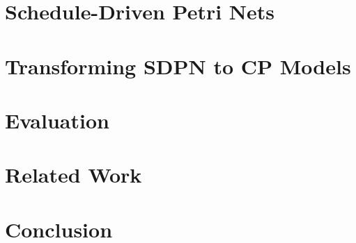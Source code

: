 \documentclass[letterpaper]{article}
\begin{document}
\section{Schedule-Driven Petri Nets}


\section{Transforming SDPN to CP Models}



\section{Evaluation}




\section{Related Work}


\section{Conclusion}




\end{document}
